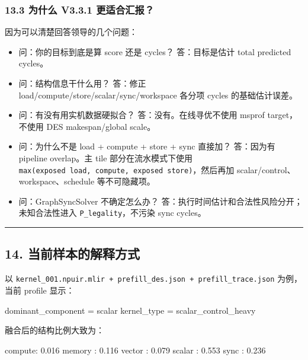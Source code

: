 \documentclass[
  10pt,
]{article}
\newenvironment{Shaded}{}{}
\newcommand{\NormalTok}[1]{#1}
\providecommand{\tightlist}{%
  \setlength{\itemsep}{0pt}\setlength{\parskip}{0pt}}
\begin{document}
\subsubsection{13.3 为什么 V3.3.1
更适合汇报？}\label{ux4e3aux4ec0ux4e48-v3.3.1-ux66f4ux9002ux5408ux6c47ux62a5}

因为可以清楚回答领导的几个问题：

\begin{itemize}
\tightlist
\item
  问：你的目标到底是算 score 还是 cycles？ 答：目标是估计 total
  predicted cycles。
\item
  问：结构信息干什么用？ 答：修正
  load/compute/store/scalar/sync/workspace 各分项 cycles
  的基础估计误差。
\item
  问：有没有用实机数据硬拟合？ 答：没有。在线寻优不使用 msprof
  target，不使用 DES makespan/global scale。
\item
  问：为什么不是 load + compute + store + sync 直接加？ 答：因为有
  pipeline overlap。主 tile 部分在流水模式下使用
  \texttt{max(exposed\ load,\ compute,\ exposed\ store)}，然后再加
  scalar/control、workspace、schedule 等不可隐藏项。
\item
  问：GraphSyncSolver 不确定怎么办？
  答：执行时间估计和合法性风险分开；未知合法性进入
  \texttt{P\_legality}，不污染 sync cycles。
\end{itemize}

\begin{center}\rule{0.5\linewidth}{0.5pt}\end{center}

\subsection{14.
当前样本的解释方式}\label{ux5f53ux524dux6837ux672cux7684ux89e3ux91caux65b9ux5f0f}

以
\texttt{kernel\_001.npuir.mlir\ +\ prefill\_des.json\ +\ prefill\_trace.json}
为例，当前 profile 显示：

\begin{Shaded}
\begin{Highlighting}[]
\NormalTok{dominant\_component = scalar}
\NormalTok{kernel\_type = scalar\_control\_heavy}
\end{Highlighting}
\end{Shaded}

融合后的结构比例大致为：

\begin{Shaded}
\begin{Highlighting}[]
\NormalTok{compute: 0.016}
\NormalTok{memory : 0.116}
\NormalTok{vector : 0.079}
\NormalTok{scalar : 0.553}
\NormalTok{sync   : 0.236}
\end{Highlighting}
\end{Shaded}
\end{document}
